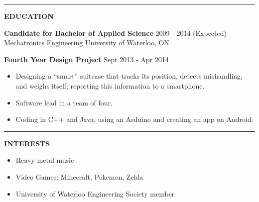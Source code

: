 \documentclass{letter}
\begin{document}
\vskip 2pt
\hrule
{\large\bf EDUCATION}

{\bf Candidate for Bachelor of Applied Science} \hfill 2009 - 2014 (Expected) \\
Mechatronics Engineering \hfill University of Waterloo, ON

{\bf Fourth Year Design Project} \hfill Sept 2013 - Apr 2014
\begin{itemize}
  \item Designing a ``smart'' suitcase that tracks its position, detects mishandling, and weighs itself; reporting this information to a smartphone.
  \item Software lead in a team of four.
  \item Coding in C++ and Java, using an Arduino and creating an app on Android.
\end{itemize}

\vskip 2pt
\hrule
{\large\bf INTERESTS}
\begin{itemize}
  \item Heavy metal music
  \item Video Games: Minecraft, Pokemon, Zelda
  \item University of Waterloo Engineering Society member
\end{itemize}
\end{document}
